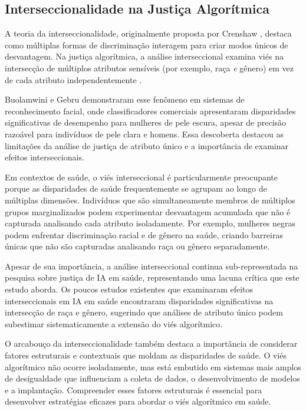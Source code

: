 \subsection{Interseccionalidade na Justiça Algorítmica}

A teoria da interseccionalidade, originalmente proposta por Crenshaw 
\cite{crenshaw1989}, destaca como múltiplas formas de discriminação 
interagem para criar modos únicos de desvantagem. Na justiça algorítmica, 
a análise interseccional examina viés na intersecção de múltiplos 
atributos sensíveis (por exemplo, raça \textit{e} gênero) em vez de cada 
atributo independentemente \cite{buolamwini2018}.

Buolamwini e Gebru \cite{buolamwini2018} demonstraram esse fenômeno em 
sistemas de reconhecimento facial, onde classificadores comerciais 
apresentaram disparidades significativas de desempenho para mulheres de 
pele escura, apesar de precisão razoável para indivíduos de pele clara 
e homens. Essa descoberta destacou as limitações da análise de justiça 
de atributo único e a importância de examinar efeitos interseccionais.

Em contextos de saúde, o viés interseccional é particularmente preocupante 
porque as disparidades de saúde frequentemente se agrupam ao longo de 
múltiplas dimensões. Indivíduos que são simultaneamente membros de múltiplos 
grupos marginalizados podem experimentar desvantagem acumulada que não é 
capturada analisando cada atributo isoladamente. Por exemplo, mulheres 
negras podem enfrentar discriminação racial e de gênero na saúde, criando 
barreiras únicas que não são capturadas analisando raça ou gênero 
separadamente.

Apesar de sua importância, a análise interseccional continua sub-representada 
na pesquisa sobre justiça de IA em saúde, representando uma lacuna crítica 
que este estudo aborda. Os poucos estudos existentes que examinaram efeitos 
interseccionais em IA em saúde encontraram disparidades significativas na 
intersecção de raça e gênero, sugerindo que análises de atributo único 
podem subestimar sistematicamente a extensão do viés algorítmico.

O arcabouço da interseccionalidade também destaca a importância de considerar 
fatores estruturais e contextuais que moldam as disparidades de saúde. O 
viés algorítmico não ocorre isoladamente, mas está embutido em sistemas mais 
amplos de desigualdade que influenciam a coleta de dados, o desenvolvimento 
de modelos e a implantação. Compreender esses fatores estruturais é essencial 
para desenvolver estratégias eficazes para abordar o viés algorítmico em saúde.
